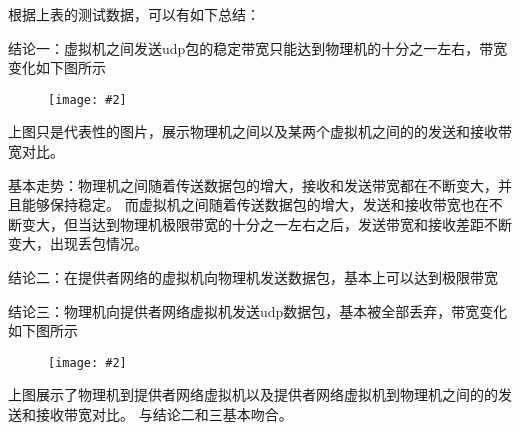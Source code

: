 \documentclass[a4paper,left=1.5cm,right=1.5cm,11pt]{article}
\newcommand{\sizedfic}[2]{\begin{figure}[H]
		\center
		\texttt{[image: \#2]}
	\end{figure}}
\begin{document}
根据上表的测试数据，可以有如下总结：\par

结论一：虚拟机之间发送udp包的稳定带宽只能达到物理机的十分之一左右，带宽变化如下图所示\\
\sizedfic{0.9}{udp1.png}
上图只是代表性的图片，展示物理机之间以及某两个虚拟机之间的的发送和接收带宽对比。\par
基本走势：物理机之间随着传送数据包的增大，接收和发送带宽都在不断变大，并且能够保持稳定。
而虚拟机之间随着传送数据包的增大，发送和接收带宽也在不断变大，但当达到物理机极限带宽的十分之一左右之后，发送带宽和接收差距不断变大，出现丢包情况。\par
结论二：在提供者网络的虚拟机向物理机发送数据包，基本上可以达到极限带宽\par
结论三：物理机向提供者网络虚拟机发送udp数据包，基本被全部丢弃，带宽变化如下图所示\\
\sizedfic{0.9}{udp2.png}
上图展示了物理机到提供者网络虚拟机以及提供者网络虚拟机到物理机之间的的发送和接收带宽对比。
与结论二和三基本吻合。
\end{document}
